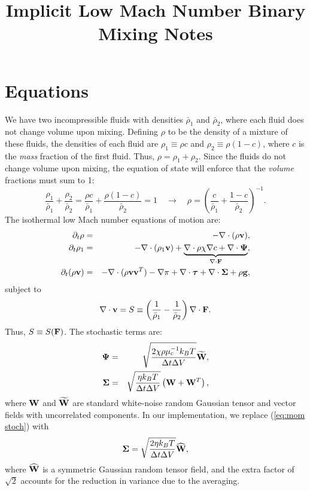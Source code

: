 \documentclass[final]{siamltex}
\def\Fb {{\bf F}}
\def\gb {{\bf g}}
\def\vb {{\bf v}}
\def\Wb {{\bf W}}
\def\Psib {\boldsymbol{\Psi}}
\def\taub {\boldsymbol{\tau}}
\def\Sigmab {\boldsymbol{\Sigma}}
\begin{document}
\title{Implicit Low Mach Number Binary Mixing Notes}

\maketitle

\section{Equations}
We have two incompressible fluids with densities $\bar\rho_1$ and $\bar\rho_2$, where 
each fluid does not change volume upon mixing.  Defining $\rho$ to be the density of
a mixture of these fluids, the densities of each fluid are $\rho_1 \equiv \rho c$ and 
$\rho_2 \equiv \rho(1-c)$, where $c$ is the {\it mass} fraction of the first fluid.  
Thus, $\rho = \rho_1 + \rho_2$.  Since the fluids do not change volume upon mixing, 
the equation of state will enforce that the {\it volume} fractions must sum to 1:
\begin{equation}
\frac{\rho_1}{\bar\rho_1} + \frac{\rho_2}{\bar\rho_2} =
\frac{\rho c}{\bar\rho_1} + \frac{\rho(1-c)}{\bar\rho_2} = 1 
\quad \rightarrow \quad
\rho = \left(\frac{c}{\bar\rho_1} + \frac{1-c}{\bar\rho_2}\right)^{-1}.
\end{equation}
The isothermal low Mach number equations of motion are:
\begin{eqnarray}
\partial_t\rho &=& -\nabla\cdot(\rho\vb),\\
\partial_t\rho_1 &=& -\nabla\cdot(\rho_1\vb) + \underbrace{\nabla\cdot\rho\chi\nabla c + \nabla\cdot\Psib}_{\nabla\cdot\Fb},\\
\partial_t(\rho\vb) &=& -\nabla\cdot(\rho\vb\vb^T) - \nabla\pi + \nabla\cdot\taub + \nabla\cdot\Sigmab + \rho\gb,
\end{eqnarray}
subject to
\begin{equation}
\nabla\cdot\vb = S \equiv \left(\frac{1}{\bar\rho_1}-\frac{1}{\bar\rho_2}\right)\nabla\cdot\Fb.
\end{equation}
Thus, $S \equiv S(\Fb)$.  The stochastic terms are:
\begin{eqnarray}
\Psib &=& \sqrt{\frac{2\chi\rho\mu_c^{-1}k_BT}{\Delta t\Delta V}}\widetilde\Wb,\\
\Sigmab &=& \sqrt{\frac{\eta k_B T}{\Delta t\Delta V}}\left(\Wb + \Wb^T\right),\label{eq:mom stoch}
\end{eqnarray}
where $\Wb$ and $\widetilde\Wb$ are standard white-noise random Gaussian tensor
and vector fields with uncorrelated components.  In our implementation, we replace
(\ref{eq:mom stoch}) with
\begin{equation}
\Sigmab = \sqrt{\frac{2\eta k_B T}{\Delta t\Delta V}}\widehat\Wb,
\end{equation}
where $\widehat\Wb$ is a symmetric Gaussian random tensor field, and the
extra factor of $\sqrt{2}$ accounts for the reduction in variance due to the averaging.
\end{document}
